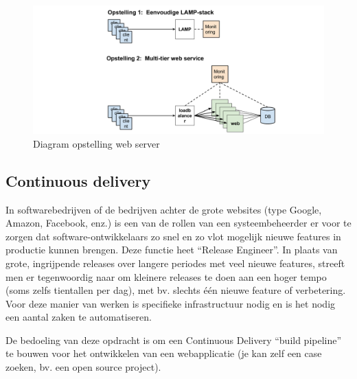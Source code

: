 \begin{figure}[htbp]
\centering
\includegraphics[width=\textwidth]{img/assignment-ha.png}
\caption{Diagram opstelling web server}
\end{figure}

\subsection{Continuous delivery}
\label{continuous-delivery}

In softwarebedrijven of de bedrijven achter de grote websites (type Google, Amazon, Facebook, enz.) is een van de rollen van een systeembeheerder er voor te zorgen dat software-ontwikkelaars zo snel en zo vlot mogelijk nieuwe features in productie kunnen brengen. Deze functie heet ``Release Engineer''. In plaats van grote, ingrijpende releases over langere periodes met veel nieuwe features, streeft men er tegenwoordig naar om kleinere releases te doen aan een hoger tempo (soms zelfs tientallen per dag), met bv. slechts één nieuwe feature of verbetering. Voor deze manier van werken is specifieke infrastructuur nodig en is het nodig een aantal zaken te automatiseren.

De bedoeling van deze opdracht is om een Continuous Delivery ``build pipeline'' te bouwen voor het ontwikkelen van een webapplicatie (je kan zelf een case zoeken, bv. een open source project).

